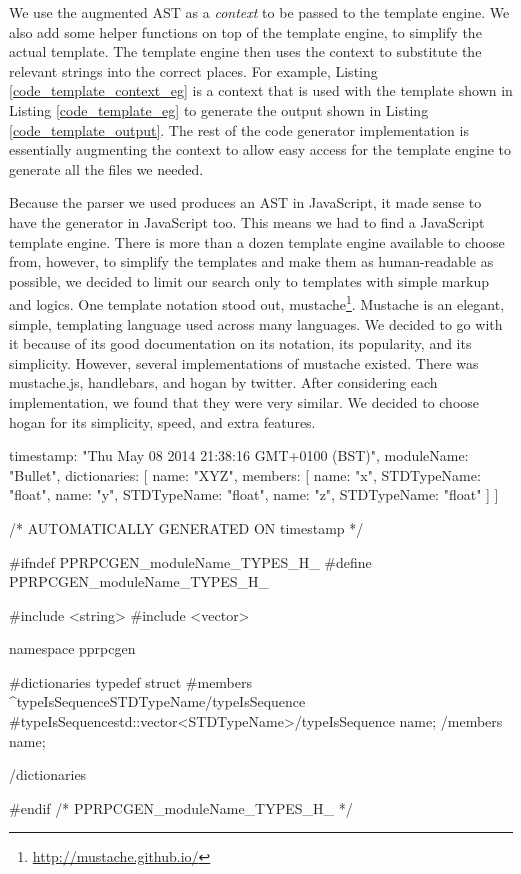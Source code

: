 We use the augmented AST as a \emph{context} to be passed to the template engine. We also add some helper functions on top of the template engine, to simplify the actual template. The template engine then uses the context to substitute the relevant strings into the correct places. For example, Listing \ref{code_template_context_eg} is a context that is used with the template shown in Listing \ref{code_template_eg} to generate the output shown in Listing \ref{code_template_output}. The rest of the code generator implementation is essentially augmenting the context to allow easy access for the template engine to generate all the files we needed.

Because the parser we used produces an AST in JavaScript, it made sense to have the generator in JavaScript too. This means we had to find a JavaScript template engine. There is more than a dozen template engine available to choose from, however, to simplify the templates and make them as human-readable as possible, we decided to limit our search only to templates with simple markup and logics. One template notation stood out, mustache\footnote{\url{http://mustache.github.io/}}. Mustache is an elegant, simple, templating language used across many languages. We decided to go with it because of its good documentation on its notation, its popularity, and its simplicity. However, several implementations of mustache existed. There was mustache.js, handlebars, and hogan by twitter. After considering each implementation, we found that they were very similar. We decided to choose hogan for its simplicity, speed, and extra features.

\begin{code}
{
  timestamp: "Thu May 08 2014 21:38:16 GMT+0100 (BST)",
  moduleName: "Bullet",
  dictionaries: [{
    name: "XYZ",
    members: [
      { name: "x", STDTypeName: "float"},
      { name: "y", STDTypeName: "float"},
      { name: "z", STDTypeName: "float"}
    ]
  }]
}
\end{code}

\begin{code}
/* AUTOMATICALLY GENERATED ON {{timestamp}} */

#ifndef PPRPCGEN_{{moduleName}}_TYPES_H_
#define PPRPCGEN_{{moduleName}}_TYPES_H_

#include <string>
#include <vector>

namespace pprpcgen{
{{#dictionaries}}
typedef struct {
  {{#members}}
  {{^typeIsSequence}}{{STDTypeName}}{{/typeIsSequence}}
  {{#typeIsSequence}}std::vector<{{STDTypeName}}>{{/typeIsSequence}}
  {{name}};
  {{/members}}
} {{name}};

{{/dictionaries}}

}

#endif /* PPRPCGEN_{{moduleName}}_TYPES_H_ */

\end{code}

